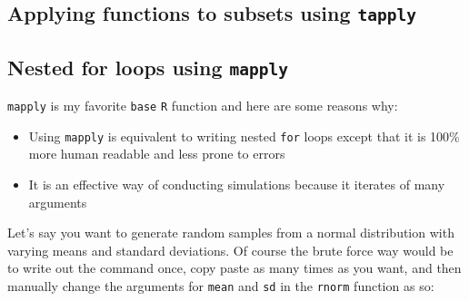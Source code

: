 \documentclass[]{book}
\makeatletter
\newenvironment{Shaded}{\begin{snugshade}}{\end{snugshade}}
\newcommand{\KeywordTok}[1]{\textcolor[rgb]{0.13,0.29,0.53}{\textbf{#1}}}
\newcommand{\CommentTok}[1]{\textcolor[rgb]{0.56,0.35,0.01}{\textit{#1}}}
\newcommand{\OperatorTok}[1]{\textcolor[rgb]{0.81,0.36,0.00}{\textbf{#1}}}
\newcommand{\NormalTok}[1]{#1}
\providecommand{\tightlist}{%
  \setlength{\itemsep}{0pt}\setlength{\parskip}{0pt}}
\providecommand{\tightlist}{%
  \setlength{\itemsep}{0pt}\setlength{\parskip}{0pt}}
\newenvironment{kframe}{%
\medskip{}
\setlength{\fboxsep}{.8em}
 \def\at@end@of@kframe{}%
 \ifinner\ifhmode%
  \def\at@end@of@kframe{\end{minipage}}%
  \begin{minipage}{\columnwidth}%
 \fi\fi%
 \def\FrameCommand##1{\hskip\@totalleftmargin \hskip-\fboxsep
 \colorbox{shadecolor}{##1}\hskip-\fboxsep
     \hskip-\linewidth \hskip-\@totalleftmargin \hskip\columnwidth}%
 \MakeFramed {\advance\hsize-\width
   \@totalleftmargin\z@ \linewidth\hsize
   \@setminipage}}%
 {\par\unskip\endMakeFramed%
 \at@end@of@kframe}
\renewenvironment{Shaded}{\begin{kframe}}{\end{kframe}}
\theoremstyle{definition}
\theoremstyle{definition}
\theoremstyle{definition}
\theoremstyle{remark}
\makeatother
\begin{document}
\subsection{\texorpdfstring{Applying functions to subsets using
\texttt{tapply}}{Applying functions to subsets using tapply}}\label{applying-functions-to-subsets-using-tapply}

\begin{Shaded}
\end{Shaded}

\subsection{\texorpdfstring{Nested for loops using
\texttt{mapply}}{Nested for loops using mapply}}\label{nested-for-loops-using-mapply}

\texttt{mapply} is my favorite \texttt{base} \texttt{R} function and
here are some reasons why:

\begin{itemize}
\tightlist
\item
  Using \texttt{mapply} is equivalent to writing nested \texttt{for}
  loops except that it is 100\% more human readable and less prone to
  errors
\item
  It is an effective way of conducting simulations because it iterates
  of many arguments
\end{itemize}

Let's say you want to generate random samples from a normal distribution
with varying means and standard deviations. Of course the brute force
way would be to write out the command once, copy paste as many times as
you want, and then manually change the arguments for \texttt{mean} and
\texttt{sd} in the \texttt{rnorm} function as so:
\end{document}
